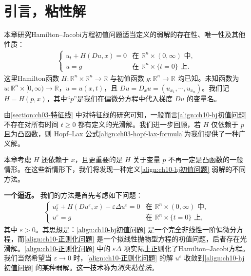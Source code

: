 \documentclass[../../main.tex]{subfiles}
\begin{document}
\section{引言，粘性解}\label{section:ch10-引言粘性解}

本章研究Hamilton--Jacobi方程初值问题适当定义的弱解的存在性、唯一性及其他性质：
\begin{align}
\begin{cases}
u_t + H(Du, x) = 0 & \text{在 } \mathbb{R}^n \times (0,\infty) \text{ 中},\\
u = g & \text{在 } \mathbb{R}^n \times \{t=0\} \text{ 上}.
\end{cases}
\label{align:ch10-hj初值问题}
\end{align}
这里Hamilton函数 $H:\mathbb{R}^n\times\mathbb{R}^n\to\mathbb{R}$ 与初值函数 $g:\mathbb{R}^n\to\mathbb{R}$ 均已知。未知函数为 $u:\mathbb{R}^n\times[0,\infty)\to\mathbb{R}$，$u=u(x,t)$，且 $Du=D_xu=(u_{x_1},\cdots,u_{x_n})$。我们记 $H=H(p,x)$，其中``$p$''是我们在偏微分方程中代入梯度 $Du$ 的变量名。

由\cref{section:ch03-特征线} 中对特征线的研究可知，一般而言\eqref{align:ch10-hj初值问题} 不存在对所有时间 $t\geqslant 0$ 都有定义的光滑解。我们进一步回顾，若 $H$ 仅依赖于 $p$ 且为凸函数，则 Hopf--Lax 公式\eqref{align:ch03-hopf-lax-formula}为我们提供了一种广义解。

本章考虑 $H$ 还依赖于 $x$，且更重要的是 $H$ 关于变量 $p$ 不再一定是凸函数的一般情形。在这些新情形下，我们将发现一种定义\eqref{align:ch10-hj初值问题} 弱解的不同方法。

\textbf{一个逼近。} 我们的方法是首先考虑如下问题：
\begin{align}
\begin{cases}
u^\varepsilon_t + H(Du^\varepsilon, x) - \varepsilon\Delta u^\varepsilon = 0 & \text{在 } \mathbb{R}^n \times (0,\infty) \text{ 中},\\
u^\varepsilon = g & \text{在 } \mathbb{R}^n \times \{t=0\} \text{ 上},
\end{cases}
\label{align:ch10-正则化问题}
\end{align}
其中 $\varepsilon>0$。其思想是：\eqref{align:ch10-hj初值问题} 是一个完全非线性一阶偏微分方程，而\eqref{align:ch10-正则化问题} 是一个拟线性抛物型方程的初值问题，后者存在光滑解。\eqref{align:ch10-正则化问题} 中的 $\varepsilon\Delta$ 项实际上正则化了Hamilton--Jacobi方程。我们当然希望当 $\varepsilon\to 0$ 时，\eqref{align:ch10-正则化问题} 的解 $u^\varepsilon$ 收敛到\eqref{align:ch10-hj初值问题} 的某种弱解。这一技术称为\emph{消失粘性法}。
\end{document}
